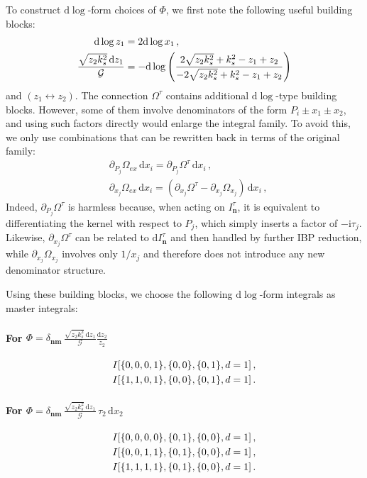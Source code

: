 \documentclass[%
 reprint,
 amsmath,amssymb,
 aps,
prd,
]{revtex4-2}
\newcommand{\n}{\nonumber}
\def\di{{\mathrm{d}}}
\def\ii{\mathrm{i}}
\newcommand{\mG}{\mathcal{G}}
\begin{document}
To construct \(\di\log\)-form choices of \(\Phi\), we first note the following useful building blocks:
\begin{align}
	\di\log z_1&=2\di\log x_1\, ,\notag\\
	\frac{\sqrt{z_2 k_s^2}\,\di z_1}{\mG}
	&= - \di\log \left(\frac{2 \sqrt{z_2 k_s^2}+k_s^2-z_1+z_2}{-2 \sqrt{z_2 k_s^2}+k_s^2-z_1+z_2}\right)
\end{align}
and $(z_1\leftrightarrow z_2)$. The connection \(\Omega^\tau\) contains additional \(\di\log\)-type building blocks. However, some of them involve denominators of the form \(P_i \pm x_1 \pm x_2\), and using such factors directly would enlarge the integral family. To avoid this, we only use combinations that can be rewritten back in terms of the original family:
\begin{align}
	&\partial_{P_j}\Omega_{ex}\,\di x_i = \partial_{P_j}\Omega^{\tau}\,\di x_i 
 \, , \n\\
	&\partial_{x_j}\Omega_{ex}\,\di x_i = (\partial_{x_j}\Omega^{\tau}-\partial_{x_j}\Omega_{x_j})\,\di x_i \,,
\end{align}
Indeed, \(\partial_{P_j}\Omega^{\tau}\) is harmless because, when acting on \(I^{\tau}_{\bm n}\), it is equivalent to differentiating the kernel with respect to \(P_j\), which simply inserts a factor of \(-\ii\tau_j\). Likewise, \(\partial_{x_j}\Omega^{\tau}\) can be related to \(\di I^{\tau}_{\bm n}\) and then handled by further IBP reduction, while \(\partial_{x_j}\Omega_{x_j}\) involves only \(1/x_j\) and therefore does not introduce any new denominator structure.

Using these building blocks, we choose the following \(\di\log\)-form integrals as master integrals:
\paragraph{For $\Phi=\delta_{\bm n\bm m}\,\frac{\sqrt{z_2 k_s^2}\,\di z_1}{\mG}\frac{\di z_2}{z_2}$}
\begin{align}
	&I[\{0, 0, 0, 1\}, \{0, 0\}, \{0, 1\}, d=1]\,,\notag\\
 &I[\{1, 1, 0, 1\}, \{0, 0\}, \{0, 1\}, d=1]\,.
 \end{align}
\paragraph{For $\Phi=\delta_{\bm n\bm m}\,\frac{\sqrt{z_2 k_s^2}\,\di z_1}{\mG}\,\tau_2\,\di x_2$}
\begin{align}
	& I[\{0, 0, 0, 0\}, \{0, 1\}, \{0, 0\}, d=1]\,, \notag\\
 &I[\{0, 0, 1, 1\}, \{0, 1\}, \{0, 0\}, d=1]\,,\notag\\
 &I[\{1, 1, 1, 1\}, \{0, 1\}, \{0, 0\}, d=1]\,.
\end{align}
\end{document}
